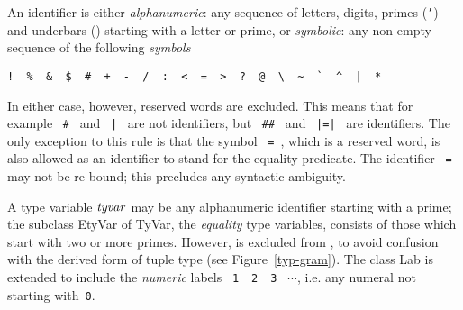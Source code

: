 An identifier is either {\sl alphanumeric}: any sequence of
letters, digits, primes ({\tt '}) and underbars (\wildpat) starting
with a letter or prime, or {\sl symbolic}: any non-empty sequence of the
following {\sl symbols}
\vspace*{-6pt}
\begin{center}
\verb(!  %  &  $  #  +  -  /  :  <  =  >  ?  @  \  ~  `  ^  |  *(
\end{center}
\vspace*{-6pt}
In either case, however, reserved words are excluded.   This means that for
example ~\verb+#+~ and ~{\tt |}~ are not identifiers, but  ~\verb+##+~ and
~{\tt |=|}~ are identifiers.
The only exception to this rule is that the symbol ~{\tt =}~, which is
a reserved word, is also allowed as an identifier to stand for
the equality predicate.
The identifier ~{\tt =}~ may not be re-bound;
this precludes any syntactic ambiguity.

A type variable ${\it tyvar}$\label{etyvar-lab} may be any
alphanumeric identifier starting with a prime; the subclass EtyVar of
TyVar, the {\sl equality} type variables, consists of those which
start with two or more primes.  
However, {\tt *} is excluded from {\TyCon},
to avoid confusion with the derived form of tuple type (see
Figure~\ref{typ-gram}). The class Lab is extended to
include the {\em numeric} labels ~{\tt 1}~~{\tt 2}~~{\tt 3}~ $\cdots$,
i.e. any numeral not starting with~{\tt 0}. 

